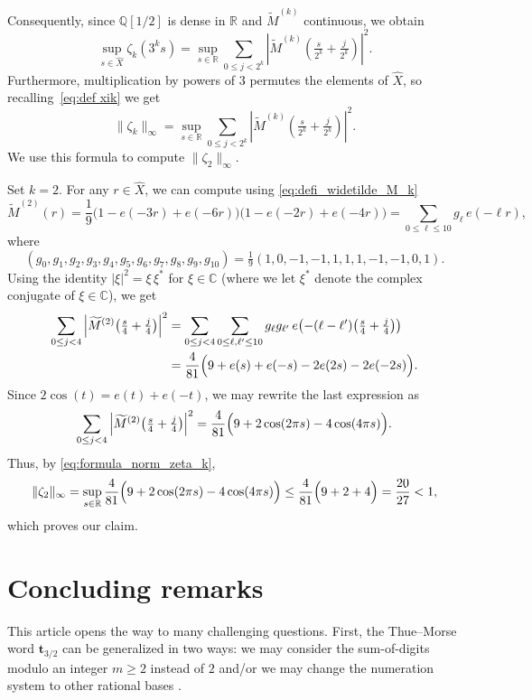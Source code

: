 \documentclass[12pt,reqno]{article}
\begin{document}
Consequently,  since $\mathbb{Q}[1/2]$ is dense in $\mathbb{R}$ and $\widetilde{M}^{(k)}$ continuous,  we obtain
\[  \sup_{s \in \widehat X}
    \zeta_k(3^ks) = 
    \sup_{s \in \mathbb{R}}
    \sum_{0 \le j < 2^k}
    |\widetilde{M}^{(k)}(\tfrac{s}{2^k} + \tfrac{j}{2^k})|^2.
\]
Furthermore,  multiplication by powers of $3$ permutes the elements of $\widehat X$, so recalling~\cref{eq:def xik} we get
\begin{equation}
    \label{eq:formula_norm_zeta_k}
    \|\zeta_k\|_\infty = 
    \sup_{s \in \mathbb{R}}
    \sum_{0 \le j < 2^k}
    |\widetilde{M}^{(k)}(\tfrac{s}{2^k} + \tfrac{j}{2^k})|^2.
\end{equation}
We use this formula to compute $\|\zeta_2\|_\infty$.

Set $k=2$. 
For any $r\in \widehat X$, we can compute using \eqref{eq:defi_widetilde_M_k}
\[
\widetilde M^{(2)}(r)
=\frac{1}{9}\bigl(1-e(-3r)+e(-6r)\bigr)\bigl(1-e(-2r)+e(-4r)\bigr)
=\sum_{0\le \ell \le 10} g_\ell \, e(-\ell r),
\]
where
\[
(g_0,g_1,g_2,g_3,g_4,g_5,g_6,g_7,g_8,g_9,g_{10})
=\tfrac{1}{9}(1,0,-1,-1,1,1,1,-1,-1,0,1).
\]
Using the identity $|\xi|^2=\xi\,\xi^*$ for $\xi\in\mathbb{C}$ (where we let $\xi^*$ denote the complex conjugate of $\xi\in\mathbb{C}$), we get
\begin{align*}
\sum_{0 \le j < 4}\left|\widetilde M^{(2)}\!\left(\tfrac{s}{4}+\tfrac{j}{4}\right)\right|^2
&= \sum_{0 \le j < 4}\sum_{0\le \ell,  \ell'\le 10} g_{\ell} g_{\ell'}\,
e\!\left(-(\ell-\ell')\!\left(\tfrac{s}{4}+\tfrac{j}{4}\right)\right) \\ 
&= \frac{4}{81}\Bigl(9+e(s)+e(-s)-2e(2s)-2e(-2s)\Bigr).
\end{align*}
Since \(2\cos(t) = e(t)+e(-t)\), we may rewrite the last expression as 
\[
\sum_{0 \le j < 4}\left|\widetilde M^{(2)}\!\left(\tfrac{s}{4}+\tfrac{j}{4}\right)\right|^2 =
\frac{4}{81}\Bigl(9+2 \cos(2\pi s) - 4 \cos(4\pi s)\Bigr).
\]
Thus, by \eqref{eq:formula_norm_zeta_k},
\[
\|\zeta_2\|_\infty =
\sup_{s \in \mathbb{R}}
\frac{4}{81}\Bigl(9+2\cos(2\pi s) - 4 \cos(4\pi s)\Bigr) \le 
\frac{4}{81}\Bigl(9+2+4\Bigr) = \frac{20}{27} < 1,
\]
which proves our claim.

\section{Concluding remarks}
\label{sec: conclusion}

This article opens the way to many challenging questions. First, the Thue--Morse word $\mathbf{t}_{3/2}$ can be generalized in two ways: we may consider the sum-of-digits modulo an integer $m\ge 2$ instead of $2$ and/or we may change the numeration system to other rational bases \cite{GolafshanRigo,Starosta}. 
\end{document}
